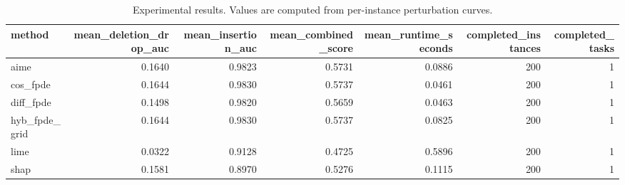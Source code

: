 \begin{table}[t]
\caption{Experimental results. Values are computed from per-instance perturbation curves.}
\label{tab:main_results_computed}
\centering
\begin{tabular}{lrrrrrr}
\toprule
method & mean\_deletion\_drop\_auc & mean\_insertion\_auc & mean\_combined\_score & mean\_runtime\_seconds & completed\_instances & completed\_tasks \\
\midrule
aime & 0.1640 & 0.9823 & 0.5731 & 0.0886 & 200 & 1 \\
cos\_fpde & 0.1644 & 0.9830 & 0.5737 & 0.0461 & 200 & 1 \\
diff\_fpde & 0.1498 & 0.9820 & 0.5659 & 0.0463 & 200 & 1 \\
hyb\_fpde\_grid & 0.1644 & 0.9830 & 0.5737 & 0.0825 & 200 & 1 \\
lime & 0.0322 & 0.9128 & 0.4725 & 0.5896 & 200 & 1 \\
shap & 0.1581 & 0.8970 & 0.5276 & 0.1115 & 200 & 1 \\
\bottomrule
\end{tabular}

\end{table}
